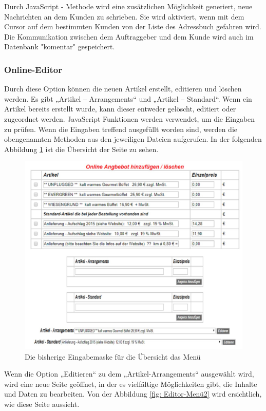 Durch JavaScript - Methode wird eine zusätzlichen Möglichkeit generiert, neue Nachrichten an dem Kunden zu schrieben. Sie wird aktiviert, wenn mit dem Cursor auf dem bestimmten Kunden von der Liste des Adressbuch gefahren wird. Die Kommunikation zwischen dem Auftraggeber und dem Kunde wird auch im Datenbank "komentar" gespeichert. 

\subsubsection{Online-Editor}

Durch diese Option können die neuen Artikel erstellt, editieren und löschen werden. Es gibt „Artikel – Arrangements“ und „Artikel – Standard“. Wenn ein Artikel bereits erstellt wurde, kann dieser entweder gelöscht, editiert oder zugeordnet werden. 
JavaScript Funktionen werden verwendet, um die Eingaben zu prüfen. Wenn die Eingaben treffend ausgefüllt worden sind, werden die obengenannten Methoden aus den jeweiligen Dateien aufgerufen. In der folgenden Abbildung \ref{fig: Online-EditorUebersicht} ist die Übersicht der Seite zu sehen.
\pagebreak

\begin{figure}[h]
	\centering
	\includegraphics[width=0.7\linewidth]{Graphics/menue-uebesicht.png}
	\caption[Kundeansicht]{Die bisherige Eingabemaske für die Übersicht das Menü}
	\label{fig: Online-EditorUebersicht}
\end{figure}

Wenn die Option „Editieren“ zu dem „Artikel-Arrangements“ ausgewählt wird, wird eine neue Seite geöffnet, in der es vielfältige Möglichkeiten gibt, die Inhalte und Daten zu bearbeiten. Von der Abbildung \ref{fig: Editor-Menü2} wird ersichtlich, wie diese Seite aussieht.


